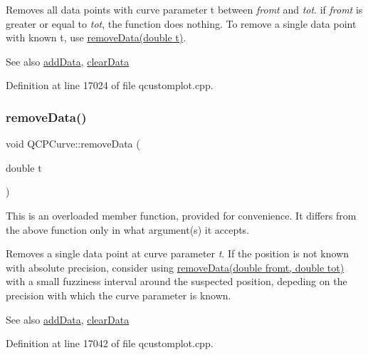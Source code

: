 Removes all data points with curve parameter t between {\itshape fromt} and {\itshape tot}. if {\itshape fromt} is greater or equal to {\itshape tot}, the function does nothing. To remove a single data point with known t, use \hyperlink{class_q_c_p_curve_a30c91acfa591ec534c49fed4c0fca39a}{remove\+Data(double t)}.

\begin{DoxySeeAlso}{See also}
\hyperlink{class_q_c_p_curve_a4e24023c3b9ac75440c7a260172c99af}{add\+Data}, \hyperlink{class_q_c_p_curve_ae0462c61dbfbac07db0736ec64110241}{clear\+Data} 
\end{DoxySeeAlso}


Definition at line 17024 of file qcustomplot.\+cpp.

\mbox{\label{class_q_c_p_curve_a30c91acfa591ec534c49fed4c0fca39a}} 
\subsubsection{\texorpdfstring{remove\+Data()}{removeData()}\hspace{0.1cm}{\footnotesize\ttfamily [2/2]}}
{\footnotesize\ttfamily void Q\+C\+P\+Curve\+::remove\+Data (\begin{DoxyParamCaption}\item[{double}]{t }\end{DoxyParamCaption})}

This is an overloaded member function, provided for convenience. It differs from the above function only in what argument(s) it accepts.

Removes a single data point at curve parameter {\itshape t}. If the position is not known with absolute precision, consider using \hyperlink{class_q_c_p_curve_ad45bb5479be799163028ef2b776f7221}{remove\+Data(double fromt, double tot)} with a small fuzziness interval around the suspected position, depeding on the precision with which the curve parameter is known.

\begin{DoxySeeAlso}{See also}
\hyperlink{class_q_c_p_curve_a4e24023c3b9ac75440c7a260172c99af}{add\+Data}, \hyperlink{class_q_c_p_curve_ae0462c61dbfbac07db0736ec64110241}{clear\+Data} 
\end{DoxySeeAlso}


Definition at line 17042 of file qcustomplot.\+cpp.

